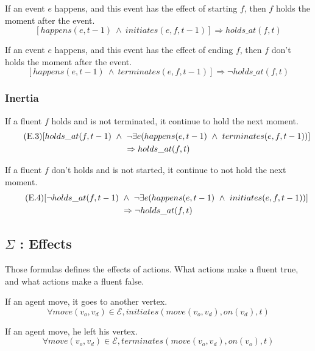 If an event $e$ happens, and this event has the effect of starting $f$, then $f$ holds the moment after the event.
\begin{equation}
  \tag{E.1}
  [happens(e,t-1)\ \land\ initiates(e,f,t-1)] \Rightarrow holds\_at(f,t)
\end{equation}

If an event $e$ happens, and this event has the effect of ending $f$, then $f$ don't holds the moment after the event.
\begin{equation}
  \tag{E.2}
  [happens(e,t-1)\ \land\ terminates(e,f,t-1)] \Rightarrow \neg holds\_at(f,t)
\end{equation}

\subsubsection{Inertia}

If a fluent $f$ holds and is not terminated, it continue to hold the next moment.
\begin{multline}
  \tag{E.3}
$$[holds\_at(f,t-1)\ \land\ \neg\exists e(happens(e,t-1)\ \land\ terminates(e,f,t-1))] \\ \Rightarrow holds\_at(f,t)$$
\end{multline}

If a fluent $f$ don't holds and is not started, it continue to not hold the next moment.
\begin{multline}
  \tag{E.4}
$$[\neg holds\_at(f,t-1)\ \land\ \neg\exists e(happens(e,t-1)\ \land\ initiates(e,f,t-1))] \\ \Rightarrow\neg holds\_at(f,t)$$
\end{multline}

\subsection{$\Sigma$ : Effects}

Those formulas defines the effects of actions. What actions make a fluent true, and what actions make a fluent false.

If an agent move, it goes to another vertex.
\begin{equation}
  \tag{$\Sigma$.1}
  \forall move(v_o,v_d) \in \mathcal{E},initiates(move(v_o,v_d),on(v_d),t)
\end{equation}

If an agent move, he left his vertex.
\begin{equation}
  \tag{$\Sigma$.2}
  \forall move(v_o,v_d) \in \mathcal{E},terminates(move(v_o,v_d),on(v_o),t)
\end{equation}

